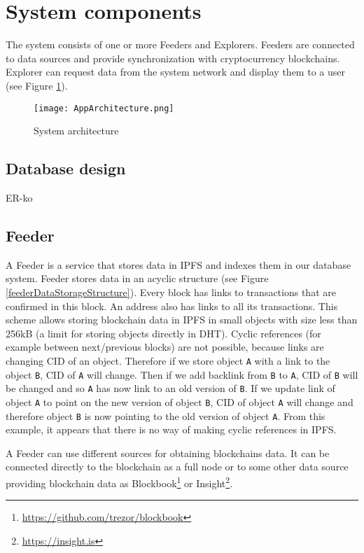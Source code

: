 \section{System components}
The system consists of one or more Feeders and Explorers. Feeders are connected to data sources and provide synchronization with cryptocurrency blockchains. Explorer can request data from the system network and display them to a user (see Figure \ref{systemArchitecture}).

\begin{figure}[h]
    \centering
    \texttt{[image: AppArchitecture.png]}
    \caption{System architecture}
    \label{systemArchitecture}
\end{figure}

\subsection{Database design}
ER-ko

\subsection{Feeder}
A Feeder is a service that stores data in IPFS and indexes them in our database system. Feeder stores data in an acyclic structure (see Figure \ref{feederDataStorageStructure}). Every block has links to transactions that are confirmed in this block. An address also has links to all its transactions. This scheme allows storing blockchain data in IPFS in small objects with size less than 256kB (a limit for storing objects directly in DHT). Cyclic references (for example between next/previous blocks) are not possible, because links are changing CID of an object. Therefore if we store object \texttt{A} with a link to the object \texttt{B}, CID of \texttt{A} will change. Then if we add backlink from \texttt{B} to \texttt{A}, CID of \texttt{B} will be changed and so \texttt{A} has now link to an old version of \texttt{B}. If we update link of object \texttt{A} to point on the new version of object \texttt{B}, CID of object \texttt{A} will change and therefore object \texttt{B} is now pointing to the old version of object \texttt{A}. From this example, it appears that there is no way of making cyclic references in IPFS.

A Feeder can use different sources for obtaining blockchains data. It can be connected directly to the blockchain as a full node or to some other data source providing blockchain data as Blockbook\footnote{\url{https://github.com/trezor/blockbook}} or Insight\footnote{\url{https://insight.is}}.


